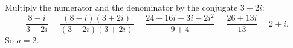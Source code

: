 Multiply the numerator and the denominator by the conjugate $3+2i$:
\[\dfrac{8-i}{3-2i}=\dfrac{(8-i)(3+2i)}{(3-2i)(3+2i)}=\dfrac{24+16i-3i-2i^2}{9+4}=\dfrac{26+13i}{13}=2+i.\]
So $a=\boxed{2}$.
